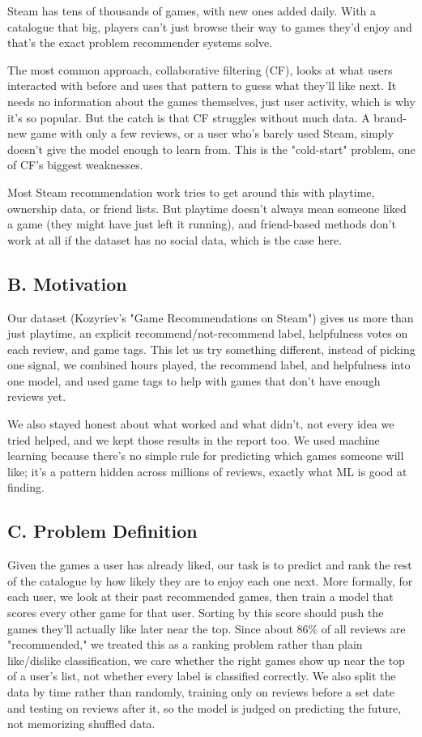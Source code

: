 \documentclass[conference]{IEEEtran}
\begin{document}
Steam has tens of thousands of games, with new ones added daily. With a catalogue that big, players can't just browse their way to games they'd enjoy and that's the exact problem recommender systems solve.

The most common approach, collaborative filtering (CF), looks at what users interacted with before and uses that pattern to guess what they'll like next. It needs no information about the games themselves, just user activity, which is why it's so popular. But the catch is that CF struggles without much data. A brand-new game with only a few reviews, or a user who's barely used Steam, simply doesn't give the model enough to learn from. This is the "cold-start" problem, one of CF's biggest weaknesses.

Most Steam recommendation work tries to get around this with playtime, ownership data, or friend lists. But playtime doesn't always mean someone liked a game (they might have just left it running), and friend-based methods don't work at all if the dataset has no social data, which is the case here.

\subsection*{B. Motivation}

Our dataset (Kozyriev's "Game Recommendations on Steam") gives us more than just playtime, an explicit recommend/not-recommend label, helpfulness votes on each review, and game tags. This let us try something different, instead of picking one signal, we combined hours played, the recommend label, and helpfulness into one model, and used game tags to help with games that don't have enough reviews yet.

We also stayed honest about what worked and what didn't, not every idea we tried helped, and we kept those results in the report too. We used machine learning because there's no simple rule for predicting which games someone will like; it's a pattern hidden across millions of reviews, exactly what ML is good at finding.

\subsection*{C. Problem Definition}

Given the games a user has already liked, our task is to predict and rank the rest of the catalogue by how likely they are to enjoy each one next. More formally, for each user, we look at their past recommended games, then train a model that scores every other game for that user. Sorting by this score should push the games they'll actually like later near the top. Since about 86\% of all reviews are "recommended," we treated this as a ranking problem rather than plain like/dislike classification, we care whether the right games show up near the top of a user's list, not whether every label is classified correctly. We also split the data by time rather than randomly, training only on reviews before a set date and testing on reviews after it, so the model is judged on predicting the future, not memorizing shuffled data.
\end{document}
